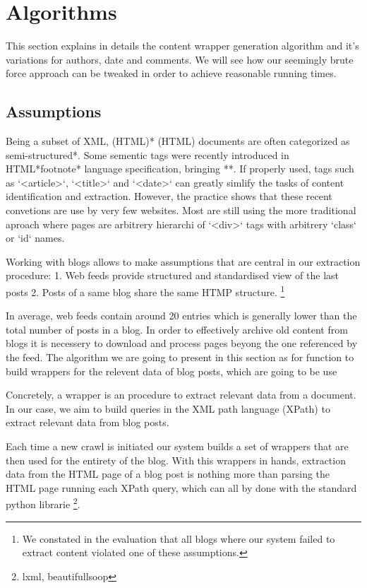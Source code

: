 \section{Algorithms}

This section explains in details the content wrapper generation algorithm and it's variations for authors, date and comments. We will see how our seemingly brute force approach can be tweaked in order to achieve reasonable running times.

\subsection{Assumptions}
Being a subset of XML, (HTML)* (HTML) documents are often categorized as semi-structured*. Some sementic tags were recently introduced in HTML*footnote* language specification, bringing **. If properly used, tags such as `<article>`, `<title>` and `<date>` can greatly simlify the tasks of content identification and extraction. However, the practice shows that these recent convetions are use by very few websites. Most are still using the more traditional aproach where pages are arbitrery hierarchi of `<div>` tags with arbitrery `class` or `id` names.

Working with blogs allows to make assumptions that are central in our extraction procedure:
1. Web feeds provide structured and standardised view of the last posts
2. Posts of a same blog share the same HTMP structure.
\footnote{We constated in the evaluation that all blogs where our system failed to extract content violated one of these assumptions.}

In average, web feeds contain around 20 entries \cite{french paper} which is generally lower than the total number of posts in a blog. In order to effectively archive old content from blogs it is necessery to download and process pages beyong the one referenced by the feed. The algorithm we are going to present in this section as for function to build wrappers for the relevent data of blog posts, which are going to be use 


Concretely, a wrapper is an procedure to extract relevant data from a document. In our case, we aim to build queries in the XML path language (XPath) to extract relevant data from blog posts.

Each time a new crawl is initiated our system builds a set of wrappers that are then used for the entirety of the blog. With this wrappers in hands, extraction data from the HTML page of a blog post is nothing more than parsing the HTML page running each XPath query, which can all by done with the standard python librarie \footnote{lxml, beautifullsoop}.

